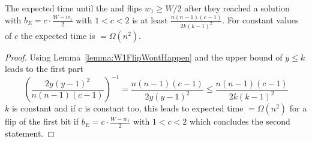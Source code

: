 \begin{corollary}\label{corollary:W1FlipWontHappen}
      The expected time until the \RLSR[k] and \RLSN[k] flips $w_1\ge W/2$ after they reached a solution with $b_E = c\cdot\frac{W-w_1}{2}$ with $1<c<2$ is at least \(\frac{n(n-1)(c-1)}{2k{(k-1)}^2}\). For constant values of $c$ the expected time is $=\Omega(n^2)$.
\end{corollary}
\begin{proof}
      Using Lemma~\ref{lemma:W1FlipWontHappen} and the upper bound of $y\le k$ leads to the first part
      \[ {(\frac{2y{(y-1)}^2}{n(n-1)(c-1)})}^{-1}=\frac{n(n-1)(c-1)}{2y{(y-1)}^2} \le\frac{n(n-1)(c-1)}{2k{(k-1)}^2}\]
      $k$ is constant and if c is constant too, this leads to expected time $=\Omega(n^2)$ for a flip of the first bit if $b_E = c\cdot\frac{W-w_1}{2}$ with $1<c<2$ which concludes the second statement.
\end{proof}

